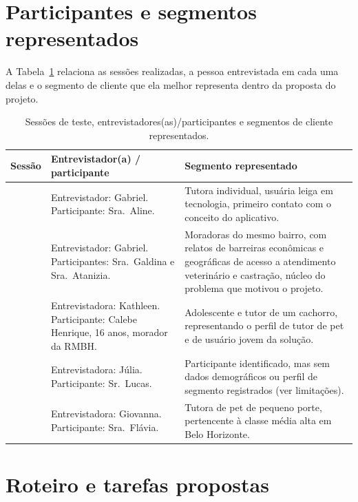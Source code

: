 \documentclass[
    12pt,
    openright,
    oneside,
    a4paper
]{abntex2}
\begin{document}
\newpage
\section{Participantes e segmentos representados}

A Tabela~\ref{tab:participantes} relaciona as sessões realizadas, a pessoa entrevistada em
cada uma delas e o segmento de cliente que ela melhor representa dentro da proposta do
projeto.

\begin{table}[H]
\centering
\small
\begin{tabular}{@{}>{\raggedright\arraybackslash}p{2.6cm}>{\raggedright\arraybackslash}p{4.4cm}>{\raggedright\arraybackslash}p{6.3cm}@{}}
\toprule
\textbf{Sessão} & \textbf{Entrevistador(a) / participante} & \textbf{Segmento representado} \\
\midrule
1 & Entrevistador: Gabriel. Participante: Sra.~Aline. & Tutora individual, usuária leiga em
tecnologia, primeiro contato com o conceito do aplicativo. \\
\addlinespace
2 & Entrevistador: Gabriel. Participantes: Sra.~Galdina e Sra.~Atanizia. & Moradoras do mesmo
bairro, com relatos de barreiras econômicas e geográficas de acesso a atendimento veterinário
e castração, núcleo do problema que motivou o projeto. \\
\addlinespace
3 & Entrevistadora: Kathleen. Participante: Calebe Henrique, 16 anos, morador da RMBH. &
Adolescente e tutor de um cachorro, representando o perfil de tutor de pet e de usuário jovem
da solução. \\
\addlinespace
4 & Entrevistadora: Júlia. Participante: Sr.~Lucas. & Participante identificado, mas sem dados
demográficos ou perfil de segmento registrados (ver limitações). \\
\addlinespace
5 & Entrevistadora: Giovanna. Participante: Sra.~Flávia. & Tutora de pet de pequeno porte,
pertencente à classe média alta em Belo Horizonte. \\
\bottomrule
\end{tabular}
\caption{Sessões de teste, entrevistadores(as)/participantes e segmentos de cliente
representados.}
\label{tab:participantes}
\end{table}


\section{Roteiro e tarefas propostas}
\end{document}
